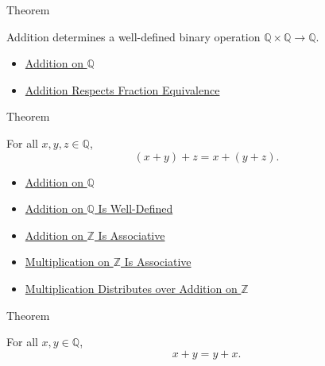 \begin{theorembox}{Theorem}
\begin{theorem}
\label{thm:addition-on-q-well-defined}
Addition determines a well-defined binary operation
$\mathbb{Q}\times\mathbb{Q}\to\mathbb{Q}$.
\end{theorem}
\end{theorembox}

\begin{dependencies}
\begin{itemize}
  \item \hyperref[def:addition-on-q-classes]{Addition on $\mathbb{Q}$}
  \item \hyperref[lem:addition-on-q-respects-equivalence]{Addition Respects Fraction Equivalence}
\end{itemize}
\end{dependencies}

\begin{theorembox}{Theorem}
\begin{theorem}
\label{thm:addition-on-q-associative}
For all $x,y,z\in\mathbb{Q}$,
\[
(x+y)+z=x+(y+z).
\]
\end{theorem}
\end{theorembox}

\begin{dependencies}
\begin{itemize}
  \item \hyperref[def:addition-on-q-classes]{Addition on $\mathbb{Q}$}
  \item \hyperref[thm:addition-on-q-well-defined]{Addition on $\mathbb{Q}$ Is Well-Defined}
  \item \hyperref[thm:addition-on-z-associative]{Addition on $\mathbb{Z}$ Is Associative}
  \item \hyperref[thm:multiplication-on-z-associative]{Multiplication on $\mathbb{Z}$ Is Associative}
  \item \hyperref[thm:multiplication-distributes-over-addition-on-z]{Multiplication Distributes over Addition on $\mathbb{Z}$}
\end{itemize}
\end{dependencies}

\begin{theorembox}{Theorem}
\begin{theorem}
\label{thm:addition-on-q-commutative}
For all $x,y\in\mathbb{Q}$,
\[
x+y=y+x.
\]
\end{theorem}
\end{theorembox}

